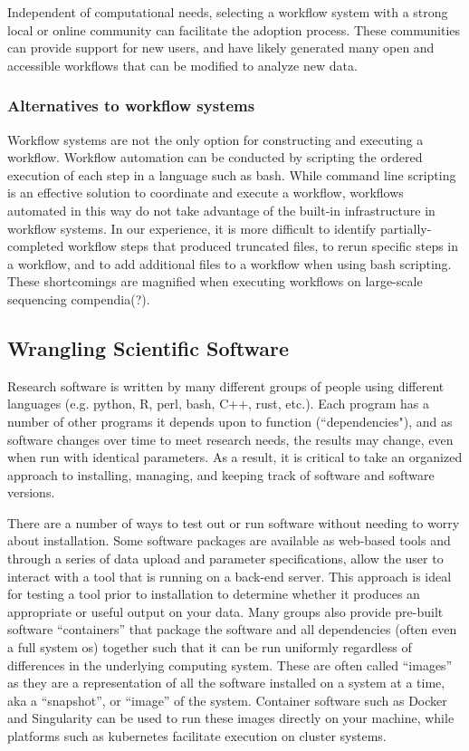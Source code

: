 \documentclass[10pt,letterpaper]{article}
\begin{document}
Independent of computational needs, selecting a workflow system with a strong local or online community can facilitate the adoption process. 
These communities can provide support for new users, and have likely generated many open and accessible workflows that can be modified to analyze new data. 

\subsubsection*{Alternatives to workflow systems}
Workflow systems are not the only option for constructing and executing a workflow.
Workflow automation can be conducted by scripting the ordered execution of each step in a language such as bash.
While command line scripting is an effective solution to coordinate and execute a workflow, workflows automated in this way do not take advantage of the built-in infrastructure in workflow systems.
In our experience, it is more difficult to identify partially-completed workflow steps that produced truncated files, to rerun specific steps in a workflow, and to add additional files to a workflow when using bash scripting.
These shortcomings are magnified when executing workflows on large-scale sequencing compendia(?).


\subsection*{Wrangling Scientific Software} 
Research software is written by many different groups of people using different languages (e.g. python, R, perl, bash, C++, rust, etc.). 
Each program has a number of other programs it depends upon to function (``dependencies"), and as software changes over time to meet research needs, the results may change, even when run with identical parameters. 
As a result, it is critical to take an organized approach to installing, managing, and keeping track of software and software versions. 

There are a number of ways to test out or run software without needing to worry about installation. 
Some software packages are available as web-based tools and through a series of data upload and parameter specifications, allow the user to interact with a tool that is running on a back-end server. 
This approach is ideal for testing a tool prior to installation to determine whether it produces an appropriate or useful output on your data. 
Many groups also provide pre-built software ``containers” that package the software and all dependencies (often even a full system os) together such that it can be run uniformly regardless of differences in the underlying computing system. 
These are often called ``images” as they are a representation of all the software installed on a system at a time, aka a ``snapshot”, or ``image” of the system. 
Container software such as Docker and Singularity can be used to run these images directly on your machine, while platforms such as kubernetes facilitate execution on cluster systems.
\end{document}
